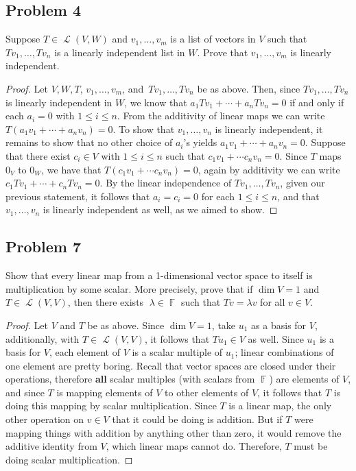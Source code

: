 \documentclass[letterpaper, 12pt]{amsart}
\DeclareMathOperator{\F}{\mathbb{F}}
\DeclareMathOperator{\Ell}{\mathscr{L}}
\theoremstyle{definition}  %
\begin{document}
		\subsection*{Problem 4}
		Suppose $T \in \Ell(V,W)$ and $v_{1}, \dots, v_{m}$ is a list of vectors in $V$ such that $Tv_{1}, \dots, Tv_{n}$ is a linearly independent list in $W$.
		Prove that $v_{1}, \dots, v_{m}$ is linearly independent.

		\begin{proof}
		Let $V,W,T$, $v_{1}, \dots, v_{m}$, and $\, Tv_{1}, \dots, Tv_{n}$ be as above.
		Then, since $Tv_{1}, \dots, Tv_{n}$ is linearly independent in $W$, we know that $a_{1}Tv_{1} + \cdots + a_{n}Tv_{n} = 0$ if and only if each $a_{i} = 0$ with $1 \leq i \leq n$.
		From the additivity of linear maps we can write $T(a_{1}v_{1} + \cdots + a_{n}v_{n}) = 0$.
		To show that $v_{1}, \dots, v_{n}$ is linearly independent, it remains to show that no other choice of $a_{i}$'s yields $a_{1}v_{1} + \cdots + a_{n}v_{n} = 0$.
		Suppose that there exist $c_{i} \in V$ with $1 \leq i \leq n$ such that $c_{1}v_{1} + \cdots c_{n}v_{n} = 0$.
		Since $T$ maps $0_{V}$ to $0_{W}$, we have that $T(c_{1}v_{1} + \cdots c_{n}v_{n}) = 0$, again by additivity we can write $c_{1}Tv_{1} + \cdots + c_{n}Tv_{n} = 0$.
		By the linear independence of $Tv_{1}, \dots, Tv_{n}$, given our previous statement, it follows that $a_{i} = c_{i} = 0$ for each $1 \leq i \leq n$, and that $v_{1}, \dots, v_{n}$ is linearly	independent as well, as we aimed to show.
		\end{proof}

		\subsection*{Problem 7}
		Show that every linear map from a 1-dimensional vector space to itself is multiplication by some scalar. 
		More precisely, prove that if $\dim V = 1$ and $T \in \Ell(V,V)$, then there exists 􏰀$\lambda \in \F$ such that $Tv = \lambda v$ for all $v \in V$.

		\begin{proof}
		Let $V$ and $T$ be as above.
		Since $\dim V = 1$, take $u_{1}$ as a basis for $V$, additionally, with $T \in \Ell(V,V)$, it follows that $Tu_{1} \in V$ as well.
		Since $u_{1}$ is a basis for $V$, each element of $V$ is a scalar multiple of $u_{1}$; linear combinations of one element are pretty boring.
		Recall that vector spaces are closed under their operations, therefore \textbf{all} scalar multiples (with scalars from $\F$) are elements of $V$, and since $T$ is mapping elements of $V$ to other elements of $V$, it follows that $T$ is doing this mapping by scalar multiplication.
		Since $T$ is a linear map, the only other operation on $v \in V$ that it could be doing is addition.
		But if $T$ were mapping things with addition by anything other than zero, it would remove the additive identity from $V$, which linear maps cannot do.
		Therefore, $T$ must be doing scalar multiplication.
		\end{proof}
\end{document}
